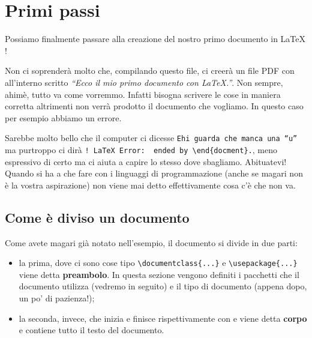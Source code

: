 \chapter{Primi passi}
Possiamo finalmente passare alla creazione del nostro primo documento in \LaTeX{}
!

Non ci soprenderà molto che, compilando questo file, ci creerà un file PDF con 
all'interno scritto \textit{``Ecco il mio primo documento con \LaTeX{}.''}. Non 
sempre, ahimè, tutto va come vorremmo. Infatti bisogna scrivere le cose in 
maniera corretta altrimenti non verrà prodotto il documento che vogliamo. In 
questo caso per esempio abbiamo un errore.

Sarebbe molto bello che il computer ci dicesse \texttt{Ehi guarda che manca 
una ``u''} ma purtroppo ci dirà 
\verb|! LaTeX Error:  ended by \end{docment}.|, meno 
espressivo di certo ma ci aiuta a capire lo stesso dove sbagliamo. Abituatevi! 
Quando si ha a che fare con i linguaggi di programmazione (anche se magari non 
è la vostra aspirazione) non viene mai detto effettivamente cosa c'è che non 
va.

\section{Come è diviso un documento}
Come avete magari già notato nell'esempio, il documento si divide in due parti:
\begin{itemize}
    \item la prima, dove ci sono cose tipo \verb!\documentclass{...}! e 
    \verb!\usepackage{...}! viene detta \textbf{preambolo}. In questa sezione 
    vengono definiti i pacchetti che il documento utilizza (vedremo in 
    seguito) e il tipo di documento (appena dopo, un po' di pazienza!);
    \item la seconda, invece, che inizia e finisce rispettivamente con 
    \verb!! e \verb!! viene detta \textbf{corpo} 
    e contiene tutto il testo del documento.
\end{itemize}

